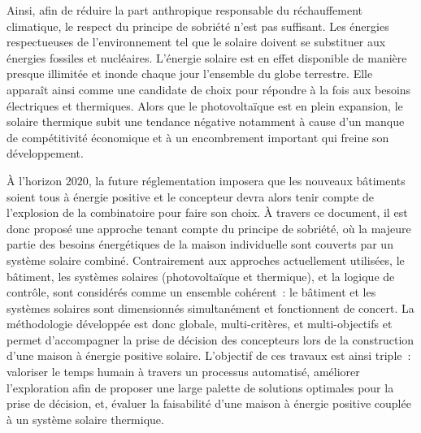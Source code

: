 Ainsi, afin de réduire la part anthropique responsable du réchauffement climatique, le
respect du principe de sobriété n’est pas suffisant. Les énergies respectueuses de
l’environnement tel que le solaire doivent se substituer aux énergies fossiles et
nucléaires. L’énergie solaire est en effet disponible de manière presque illimitée et
inonde chaque jour l’ensemble du globe terrestre. Elle apparaît ainsi comme une candidate
de choix pour répondre à la fois aux besoins électriques et thermiques. Alors que le
photovoltaïque est en plein expansion, le solaire thermique subit une tendance négative
notamment à cause d’un manque de compétitivité économique et à un encombrement important
qui freine son développement.

À l’horizon $2020$, la future réglementation imposera que les nouveaux bâtiments soient
tous à énergie positive et le concepteur devra alors tenir compte de l’explosion de la
combinatoire pour faire son choix. À travers ce document, il est donc proposé une approche
tenant compte du principe de sobriété, où la majeure partie des besoins énergétiques de la
maison individuelle sont couverts par un système solaire combiné. Contrairement aux
approches actuellement utilisées, le bâtiment, les systèmes solaires (photovoltaïque et
thermique), et la logique de contrôle, sont considérés comme un ensemble cohérent~: le
bâtiment et les systèmes solaires sont dimensionnés simultanément et fonctionnent de
concert. La méthodologie développée est donc globale, multi-critères, et multi-objectifs
et permet d’accompagner la prise de décision des concepteurs lors de la construction d’une
maison à énergie positive solaire. L’objectif de ces travaux est ainsi triple~: valoriser
le temps humain à travers un processus automatisé, améliorer l’exploration afin de
proposer une large palette de solutions optimales pour la prise de décision, et, évaluer
la faisabilité d’une maison à énergie positive couplée à un système solaire thermique.


